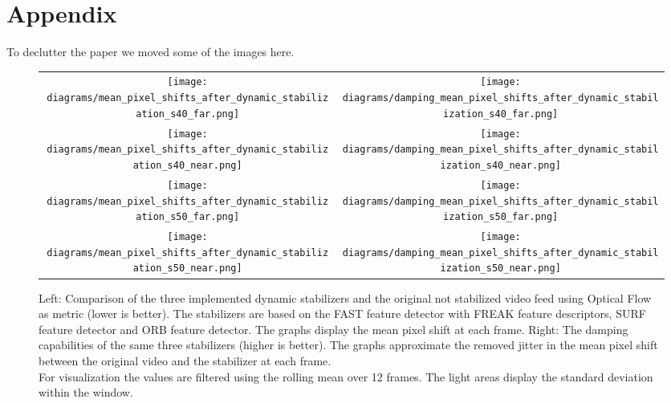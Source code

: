 \newpage

\section{Appendix}
To declutter the paper we moved some of the images here.

\begin{figure*}[!ht]
    \begin{tabular}{cc}
      \texttt{[image: diagrams/mean\_pixel\_shifts\_after\_dynamic\_stabilization\_s40\_far.png]}    &  
      \texttt{[image: diagrams/damping\_mean\_pixel\_shifts\_after\_dynamic\_stabilization\_s40\_far.png]}   \\ 

      \texttt{[image: diagrams/mean\_pixel\_shifts\_after\_dynamic\_stabilization\_s40\_near.png]}    &  
      \texttt{[image: diagrams/damping\_mean\_pixel\_shifts\_after\_dynamic\_stabilization\_s40\_near.png]}      \\

      \texttt{[image: diagrams/mean\_pixel\_shifts\_after\_dynamic\_stabilization\_s50\_far.png]}    &  
      \texttt{[image: diagrams/damping\_mean\_pixel\_shifts\_after\_dynamic\_stabilization\_s50\_far.png]}    \\

      \texttt{[image: diagrams/mean\_pixel\_shifts\_after\_dynamic\_stabilization\_s50\_near.png]}    &  
      \texttt{[image: diagrams/damping\_mean\_pixel\_shifts\_after\_dynamic\_stabilization\_s50\_near.png]}    
    \end{tabular}
    \caption{
        Left: 
        Comparison of the three implemented dynamic stabilizers and the original not stabilized video feed using Optical Flow as metric (lower is better).
        The stabilizers are based on the 
        FAST \cite{Ghahremani_2021,opencv_library} feature detector with FREAK \cite{alahi6247715,opencv_library} feature descriptors,
        SURF \cite{bay10.1007/11744023_32,opencv_library} feature detector and
        ORB \cite{rublee6126544, opencv_library} feature detector.
        The graphs display the mean pixel shift at each frame. 
        Right: 
        The damping capabilities of the same three stabilizers (higher is better). 
        The graphs approximate the removed jitter in the mean pixel shift between the original video and the stabilizer at each frame.\\
        For visualization the values are filtered using the rolling mean over 12 frames. 
        The light areas display the standard deviation within the window.
    }
    \label{fig:dynamic_stabilization_appendix}
    \end{figure*}
